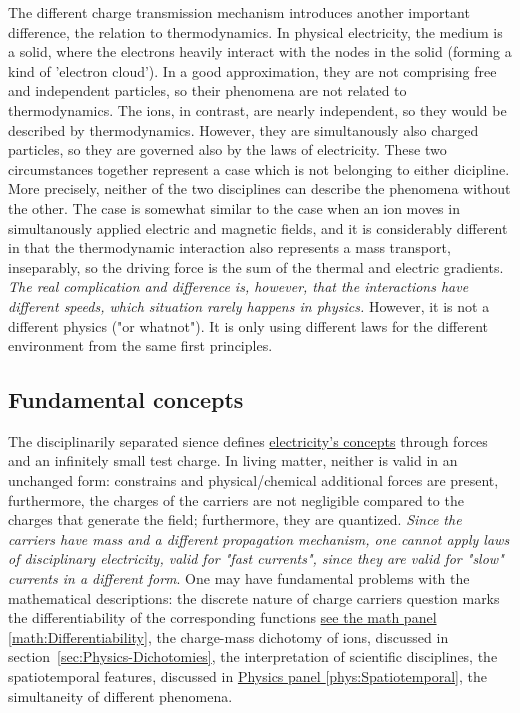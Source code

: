 The different charge transmission mechanism introduces another important difference, the relation to thermodynamics.
In physical electricity, the medium is a solid, where the electrons heavily interact with the nodes in the solid (forming a kind of 'electron cloud'). In a good approximation, they are not comprising free and independent particles, so their phenomena are not related to thermodynamics. The ions, in contrast,
are nearly independent, so they would be described by thermodynamics.
However, they are simultanously also charged particles, so they are governed also by the laws of electricity. These two circumstances together represent a case which is not belonging to either dicipline.
More precisely, neither of the two disciplines can describe the
phenomena without the other.
The case is somewhat similar to the case when an ion moves in simultanously applied electric and magnetic fields,
and it is considerably different in that the thermodynamic interaction also represents a mass transport,
inseparably, so the driving force is the sum of the thermal and electric gradients.
\textit{The real complication and difference is, however, that the interactions have different speeds, which situation rarely happens in physics.}
However, it is not a different physics ("or whatnot").
It is only using different laws for the different environment
from the same first principles.
 
\subsection[Concepts]{Fundamental concepts\label{sec:PHYSICS_ELECTRICFundamental}}  

The disciplinarily separated sience defines \href{http://hyperphysics.phy-astr.gsu.edu/hbase/electric/elefie.html#c1}{electricity's concepts}
through forces and an infinitely small test charge. In living matter,
neither is valid in an unchanged form: constrains and physical/chemical additional forces are present, furthermore, the charges of the carriers are not
negligible compared to the charges that generate the field; furthermore, they are quantized. \textit{Since the carriers have mass and a different propagation mechanism, 
one cannot apply laws of disciplinary electricity, valid for "fast currents", since they are valid for "slow" currents in a different form}. One may have fundamental problems with the mathematical descriptions: 
the discrete nature of charge carriers question marks  the differentiability of the corresponding functions
\hyperlink{math:Differentiability}{see the math panel \ref{math:Differentiability}},  
the charge-mass dichotomy of ions, discussed in section~\ref{sec:Physics-Dichotomies}, the interpretation 
of scientific disciplines, the spatiotemporal features,
discussed in \hyperlink{phys:Spatiotemporal}{Physics panel \ref{phys:Spatiotemporal}},
the simultaneity of different phenomena.
 

